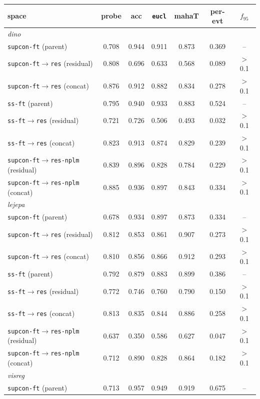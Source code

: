 \documentclass{article}
\begin{document}
\begin{table}[p]\centering\small
\setlength{\tabcolsep}{4pt}
\begin{tabular}{lcccccc}
\toprule
space & probe & acc & \texttt{eucl} & mahaT & per-evt & $f_{95}$ \\
\midrule
\multicolumn{7}{l}{\emph{dino}}\\
\texttt{supcon-ft} (parent) & 0.708 & 0.944 & 0.911 & 0.873 & 0.369 & -- \\
\texttt{supcon-ft$\to$res} (residual) & 0.808 & 0.696 & 0.633 & 0.568 & 0.089 & $>$0.1 \\
\texttt{supcon-ft$\to$res} (concat) & 0.876 & 0.912 & 0.882 & 0.834 & 0.278 & $>$0.1 \\
\texttt{ss-ft} (parent) & 0.795 & 0.940 & 0.933 & 0.883 & 0.524 & -- \\
\texttt{ss-ft$\to$res} (residual) & 0.721 & 0.726 & 0.506 & 0.493 & 0.032 & $>$0.1 \\
\texttt{ss-ft$\to$res} (concat) & 0.823 & 0.913 & 0.874 & 0.829 & 0.239 & $>$0.1 \\
\texttt{supcon-ft$\to$res-nplm} (residual) & 0.839 & 0.896 & 0.828 & 0.784 & 0.229 & $>$0.1 \\
\texttt{supcon-ft$\to$res-nplm} (concat) & 0.885 & 0.936 & 0.897 & 0.843 & 0.334 & $>$0.1 \\
\multicolumn{7}{l}{\emph{lejepa}}\\
\texttt{supcon-ft} (parent) & 0.678 & 0.934 & 0.897 & 0.873 & 0.334 & -- \\
\texttt{supcon-ft$\to$res} (residual) & 0.812 & 0.853 & 0.861 & 0.907 & 0.273 & $>$0.1 \\
\texttt{supcon-ft$\to$res} (concat) & 0.810 & 0.856 & 0.866 & 0.912 & 0.293 & $>$0.1 \\
\texttt{ss-ft} (parent) & 0.792 & 0.879 & 0.883 & 0.899 & 0.386 & -- \\
\texttt{ss-ft$\to$res} (residual) & 0.772 & 0.746 & 0.760 & 0.790 & 0.150 & $>$0.1 \\
\texttt{ss-ft$\to$res} (concat) & 0.813 & 0.835 & 0.844 & 0.886 & 0.258 & $>$0.1 \\
\texttt{supcon-ft$\to$res-nplm} (residual) & 0.637 & 0.350 & 0.586 & 0.627 & 0.047 & $>$0.1 \\
\texttt{supcon-ft$\to$res-nplm} (concat) & 0.712 & 0.890 & 0.828 & 0.864 & 0.182 & $>$0.1 \\
\multicolumn{7}{l}{\emph{visreg}}\\
\texttt{supcon-ft} (parent) & 0.713 & 0.957 & 0.949 & 0.919 & 0.675 & -- \\

\end{tabular}
\end{table}
\end{document}
